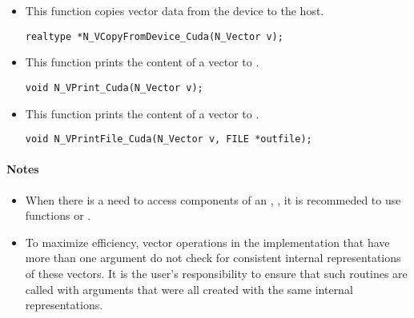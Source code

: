 \begin{itemize}

\item {}
 
 This function copies vector data from the device to the host.

 \verb|realtype *N_VCopyFromDevice_Cuda(N_Vector v);|



\item {}
  
  This function prints the content of a {\cuda} vector to . 
    
  \verb|void N_VPrint_Cuda(N_Vector v);|


\item {}
  
  This function prints the content of a {\cuda} vector to . 
    
  \verb|void N_VPrintFile_Cuda(N_Vector v, FILE *outfile);|


\end{itemize}
\paragraph{\bf Notes} 
           
\begin{itemize}
                                        
\item
  When there is a need to access components of an , , 
  it is recommeded to use functions  or 
  .        
                                                               

\item
  {\warn}To maximize efficiency, vector operations in the {\nveccuda} implementation
  that have more than one  argument do not check for
  consistent internal representations of these vectors. It is the user's 
  responsibility to ensure that such routines are called with 
  arguments that were all created with the same internal representations.

\end{itemize}


